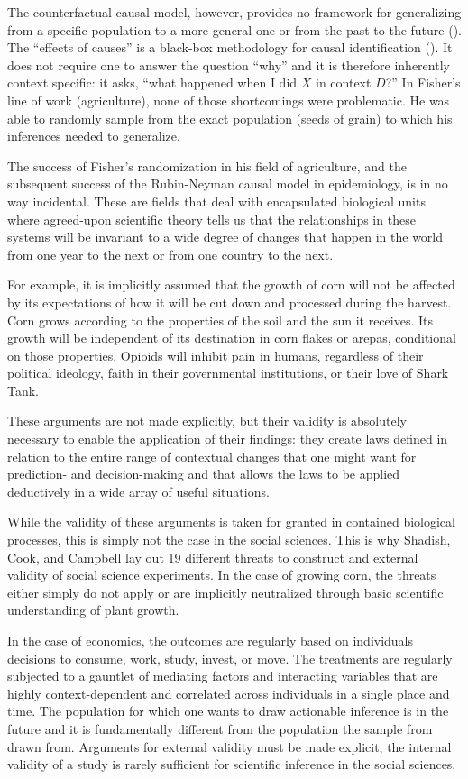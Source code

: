 \documentclass[a4paper,12pt]{article}
\begin{document}
The counterfactual causal model, however, provides no framework for generalizing from a specific population to a more general one or from the past to the future (\cite{Heckman2008}). The ``effects of causes'' is a black-box methodology for causal identification  (\cite{Heckman2008}). It does not require one to answer the question ``why'' and it is therefore inherently context specific: it asks, ``what happened when I did $X$ in context $D$?'' In Fisher's line of work (agriculture), none of those shortcomings were problematic. He was able to randomly sample from the exact population (seeds of grain) to which his inferences needed to generalize.

The success of Fisher's randomization in his field of agriculture, and the subsequent success of the Rubin-Neyman causal model in epidemiology, is in no way incidental. These are fields that deal with encapsulated biological units where agreed-upon scientific theory tells us that the relationships in these systems will be invariant to a wide degree of changes that happen in the world from one year to the next or from one country to the next.

For example, it is implicitly assumed that the growth of corn will not be affected by its expectations of how it will be cut down and processed during the harvest. Corn grows according to the properties of the soil and the sun it receives. Its growth will be independent of its destination in corn flakes or arepas, conditional on those properties. Opioids will inhibit pain in humans, regardless of their political ideology, faith in their governmental institutions, or their love of Shark Tank.

These arguments are not made explicitly, but their validity is absolutely necessary to enable the application of their findings: they create laws defined in relation to the entire range of contextual changes that one might want for prediction- and decision-making and that allows the laws to be applied deductively in a wide array of useful situations.

While the validity of these arguments is taken for granted in contained biological processes, this is simply not the case in the social sciences. This is why Shadish, Cook, and Campbell lay out 19 different threats to construct and external validity of social science experiments. In the case of growing corn, the threats either simply do not apply or are implicitly neutralized through basic scientific understanding of plant growth.

In the case of economics, the outcomes are regularly based on individuals decisions to consume, work, study, invest, or move. The treatments are regularly subjected to a gauntlet of mediating factors and interacting variables that are highly context-dependent and correlated across individuals in a single place and time. The population for which one wants to draw actionable inference is in the future and it is fundamentally different from the population the sample from drawn from. Arguments for external validity must be made explicit, the internal validity of a study is rarely sufficient for scientific inference in the social sciences.
\end{document}
